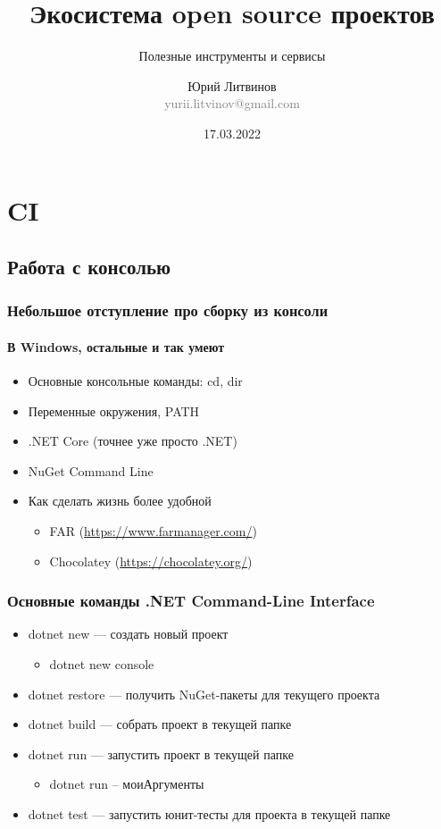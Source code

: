 \documentclass[xetex,mathserif,serif]{beamer}
\title{Экосистема open source проектов}
\subtitle{Полезные инструменты и сервисы}
\author[Юрий Литвинов]{Юрий Литвинов\\\small{\textcolor{gray}{yurii.litvinov@gmail.com}}}
\date{17.03.2022}
\begin{document}
    \frame{\titlepage}

    \section{CI}

    \subsection{Работа с консолью}

    \begin{frame}
        \frametitle{Небольшое отступление про сборку из консоли}
        \framesubtitle{В Windows, остальные и так умеют}
        \begin{itemize}
            \item Основные консольные команды: cd, dir
            \item Переменные окружения, PATH
            \item .NET Core (точнее уже просто .NET)
            \item NuGet Command Line
            \item Как сделать жизнь более удобной
            \begin{itemize}
                \item FAR (\url{https://www.farmanager.com/})
                \item Chocolatey (\url{https://chocolatey.org/})
            \end{itemize}
        \end{itemize}
    \end{frame}

    \begin{frame}
        \frametitle{Основные команды .NET Command-Line Interface}
        \begin{itemize}
            \item dotnet new --- создать новый проект
            \begin{itemize}
                \item dotnet new console
            \end{itemize}
            \item dotnet restore --- получить NuGet-пакеты для текущего проекта
            \item dotnet build --- собрать проект в текущей папке
            \item dotnet run --- запустить проект в текущей папке
            \begin{itemize}
                \item dotnet run -- моиАргументы
            \end{itemize}
            \item dotnet test --- запустить юнит-тесты для проекта в текущей папке
        \end{itemize}
    \end{frame}
\end{document}
